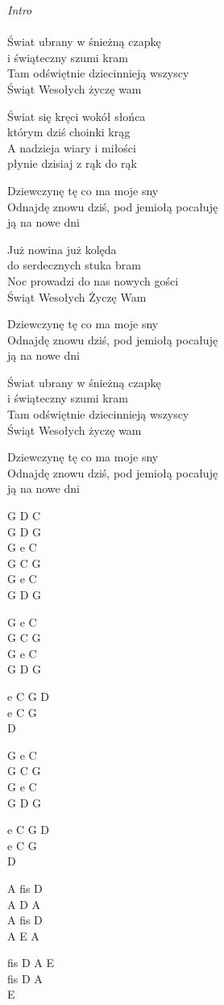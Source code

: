 \begin{text}
    \textit{Intro}\\
	\\
    Świat ubrany w śnieżną czapkę\\
    i świąteczny szumi kram\\
	Tam odświętnie dziecinnieją wszyscy\\
	Świąt Wesołych życzę wam
	
	Świat się kręci wokół słońca\\
	którym dziś choinki krąg\\
	A nadzieja wiary i miłości\\
	płynie dzisiaj z rąk do rąk
	
	Dziewczynę tę co ma moje sny\\
    Odnajdę znowu dziś, pod jemiołą pocałuję\\
	ją na nowe dni
	
	Już nowina już kolęda\\
	do serdecznych stuka bram\\
	Noc prowadzi do nas nowych gości\\
	Świąt Wesołych Życzę Wam
	
	Dziewczynę tę co ma moje sny\\
    Odnajdę znowu dziś, pod jemiołą pocałuję\\
	ją na nowe dni
	
	Świat ubrany w śnieżną czapkę\\
    i świąteczny szumi kram\\
	Tam odświętnie dziecinnieją wszyscy\\
	Świąt Wesołych życzę wam
	
	Dziewczynę tę co ma moje sny\\
    Odnajdę znowu dziś, pod jemiołą pocałuję\\
	ją na nowe dni
\end{text}
\begin{chord}
    G D C\\
	G D G\\
	G e C\\
	G C G\\
	G e C\\
	G D G
	
    G e C\\
	G C G\\
	G e C\\
	G D G
	
	e C G D\\
	e C G\\
	D
	
	G e C\\
	G C G\\
	G e C\\
	G D G
	
	e C G D\\
	e C G\\
	D
	
	A fis D\\
	A D A\\
	A fis D\\
	A E A
	
	fis D A E\\
	fis D A\\
	E
\end{chord}
